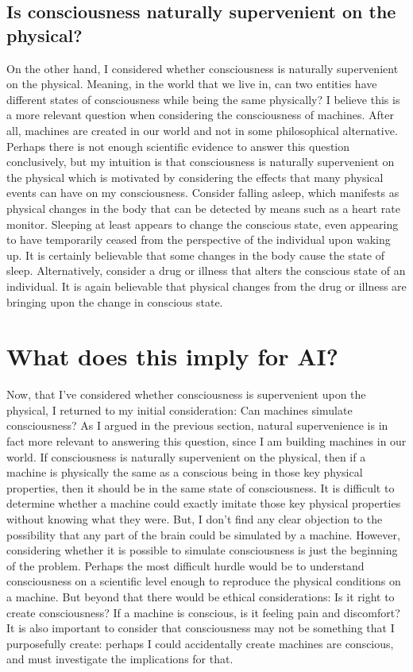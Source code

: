 \documentclass{article}
\begin{document}
\subsection*{Is consciousness naturally supervenient on the physical?}

On the other hand, I considered whether consciousness is naturally supervenient on the physical. Meaning, in the world that we live in, can two entities have different states of consciousness while being the same physically? I believe this is a more relevant question when considering the consciousness of machines. After all, machines are created in our world and not in some philosophical alternative.
Perhaps there is not enough scientific evidence to answer this question conclusively, but my intuition is that consciousness is naturally supervenient on the physical which is motivated by considering the effects that many physical events can have on my consciousness. Consider falling asleep, which manifests as physical changes in the body that can be detected by means such as a heart rate monitor. Sleeping at least appears to change the conscious state, even appearing to have temporarily ceased from the perspective of the individual upon waking up. It is certainly believable that some changes in the body cause the state of sleep. Alternatively, consider a drug or illness that alters the conscious state of an individual. It is again believable that physical changes from the drug or illness are bringing upon the change in conscious state.


\section*{What does this imply for AI?}

Now, that I've considered whether consciousness is supervenient upon the physical, I returned to my initial consideration: Can machines simulate consciousness?  As I argued in the previous section, natural supervenience is in fact more relevant to answering this question, since I am building machines in our world. If consciousness is naturally supervenient on the physical, then if a machine is physically the same as a conscious being in those key physical properties, then it should be in the same state of consciousness. It is difficult to determine whether a machine could exactly imitate those key physical properties without knowing what they were. But, I don’t find any clear objection to the possibility that any part of the brain could be simulated by a machine.
However, considering whether it is possible to simulate consciousness is just the beginning of the problem. Perhaps the most difficult hurdle would be to understand consciousness on a scientific level enough to reproduce the physical conditions on a machine. But beyond that there would be ethical considerations: Is it right to  create consciousness?  If a machine is  conscious,  is it feeling pain and discomfort?  It is also important to consider that consciousness may not be something that I purposefully create: perhaps I could accidentally create machines are conscious, and must investigate the implications for that.
\end{document}
